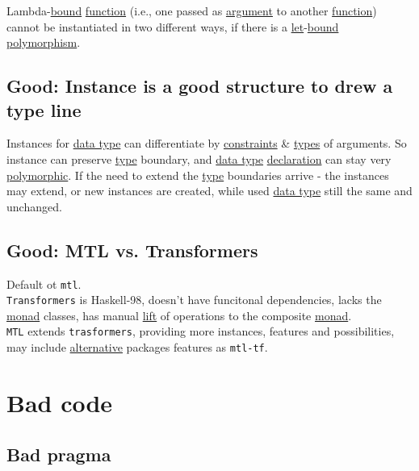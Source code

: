\documentclass[11pt]{article}
\begin{document}
Lambda-\hyperref[org7d65bda]{bound} \hyperref[orgeb5cddb]{function} (i.e., one passed as \hyperref[orgf66a5f7]{argument} to another \hyperref[orgeb5cddb]{function}) cannot be instantiated in two different ways, if there is a \hyperref[org6b52ae3]{let}-\hyperref[org7d65bda]{bound} \hyperref[org4bdf515]{polymorphism}.\\


\subsection{\label{org5e5a4f0}Good: Instance is a good structure to drew a type line}
\label{sec:orgbd41242}

Instances for \hyperref[org965cde3]{data type} can differentiate by \hyperref[org76311a9]{constraints} \& \hyperref[org3927fd9]{types} of arguments. So instance can preserve \hyperref[org4fbaeb8]{type} boundary, and \hyperref[org965cde3]{data type} \hyperref[org56ef1b9]{declaration} can stay very \hyperref[org84d7fee]{polymorphic}. If the need to extend the \hyperref[org4fbaeb8]{type} boundaries arrive - the instances may extend, or new instances are created, while used \hyperref[org965cde3]{data type} still the same and unchanged.\\

\subsection{\label{orge27be73}Good: MTL vs. Transformers}
\label{sec:org9838b7c}
Default ot \texttt{mtl}.\\

\texttt{Transformers} is Haskell-98, doesn't have funcitonal dependencies, lacks the \hyperref[org268aaf1]{monad} classes, has manual \hyperref[org70ed855]{lift} of operations to the composite \hyperref[org268aaf1]{monad}.\\

\texttt{MTL} extends \texttt{trasformers}, providing more instances, features and possibilities, may include \hyperref[org1636559]{alternative} packages features as \texttt{mtl-tf}.\\

\section{Bad code}
\label{sec:orgf136e48}
\subsection{\label{orgd4a7e58}Bad pragma}
\label{sec:org0656cc7}
\end{document}
